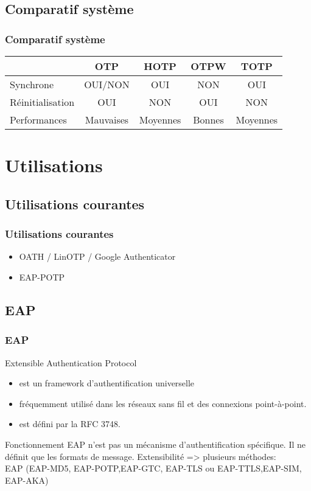 \documentclass{beamer}
\begin{document}
\subsection{Comparatif système}
\begin{frame}
\frametitle{Comparatif système}
\begin{tabular}{|l|c|c|c|c|}
 \hline
 & OTP & HOTP & OTPW & TOTP\\
 \hline
 Synchrone & OUI/NON & OUI & NON & OUI \\
 \hline
 Réinitialisation & OUI & NON & OUI & NON \\
 \hline
 Performances & Mauvaises & Moyennes & Bonnes & Moyennes\\
 \hline
  \end{tabular}
\end{frame}

\section{Utilisations}
\subsection{Utilisations courantes}
\begin{frame}
\frametitle{Utilisations courantes}
\begin{itemize}
 \item OATH / LinOTP / Google Authenticator
 \item EAP-POTP
\end{itemize}
\end{frame}


\subsection{EAP}
  \begin{frame}
  \frametitle{EAP}
        \begin{block}{Extensible Authentication Protocol }
\begin{itemize}
\item est un framework d'authentification universelle
\item fréquemment utilisé dans les réseaux sans fil et des connexions point-à-point.
\item est défini par la RFC 3748.
\end{itemize}
    \end{block}
        \begin{block}{Fonctionnement}
EAP n'est pas un mécanisme d'authentification spécifique. Il ne définit que les formats de message.
Extensibilité => plusieurs méthodes: \\ EAP (EAP-MD5, EAP-POTP,EAP-GTC, EAP-TLS ou EAP-TTLS,EAP-SIM, EAP-AKA)
\end{block}
  \end{frame}
  
\end{document}
